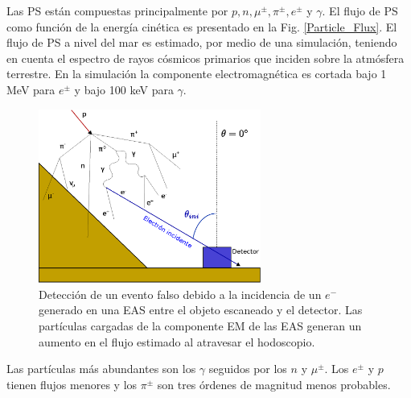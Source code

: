 Las PS están compuestas principalmente por $p,n,\mu^{\pm},\pi^{\pm},e^{\pm}$ y $\gamma$. El flujo de PS como función de la energía cinética es presentado en la Fig. \ref{Particle_Flux}. El flujo de PS a nivel del mar es estimado, por medio de una simulación, teniendo en cuenta el espectro de rayos cósmicos primarios que inciden sobre la atmósfera terrestre. En la simulación la componente  electromagnética es cortada bajo 1 MeV para $e^{\pm}$ y bajo 100 keV para $\gamma$.

\begin{figure}[h!]
\begin{center}
\includegraphics[width=0.65\textwidth]{Figures/EAS.eps}
\caption[Detección de un evento falso debido a la incidencia de un $e^-$ generado en una EAS entre el objeto escaneado y el detector]{Detección de un evento falso debido a la incidencia de un $e^-$ generado en una EAS entre el objeto escaneado y el detector. Las partículas cargadas de la componente EM de las EAS generan un aumento en el flujo estimado al atravesar el hodoscopio.}
\label{EAS}
\end{center}
\end{figure}

Las partículas más abundantes son los $\gamma$ seguidos por los $n$ y $\mu^{\pm}$. Los $e^{\pm}$ y $p$ tienen flujos menores y los $\pi^{\pm}$ son tres órdenes de magnitud menos probables.\\

